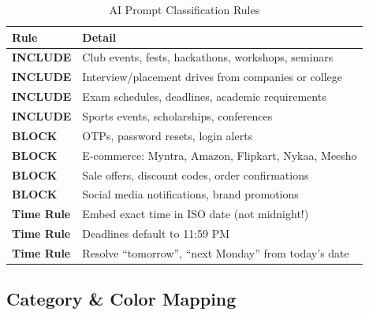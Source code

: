 \documentclass[12pt,a4paper]{report}
\begin{document}
\begin{table}[H]
\centering
{}
\begin{tabularx}{\textwidth}{>{\bfseries}l X}
\rowcolor{tableheadbg}
\color{white}Rule & \color{white}Detail \\
\toprule
INCLUDE          & Club events, fests, hackathons, workshops, seminars \\
INCLUDE          & Interview/placement drives from companies or college \\
INCLUDE          & Exam schedules, deadlines, academic requirements     \\
INCLUDE          & Sports events, scholarships, conferences             \\
BLOCK            & OTPs, password resets, login alerts                 \\
BLOCK            & E-commerce: Myntra, Amazon, Flipkart, Nykaa, Meesho \\
BLOCK            & Sale offers, discount codes, order confirmations     \\
BLOCK            & Social media notifications, brand promotions         \\
Time Rule        & Embed exact time in ISO date (not midnight!)         \\
Time Rule        & Deadlines default to 11:59 PM                       \\
Time Rule        & Resolve ``tomorrow'', ``next Monday'' from today's date \\
\bottomrule
\end{tabularx}
\caption{AI Prompt Classification Rules}
\end{table}

\subsection{Category \& Color Mapping}
\end{document}
